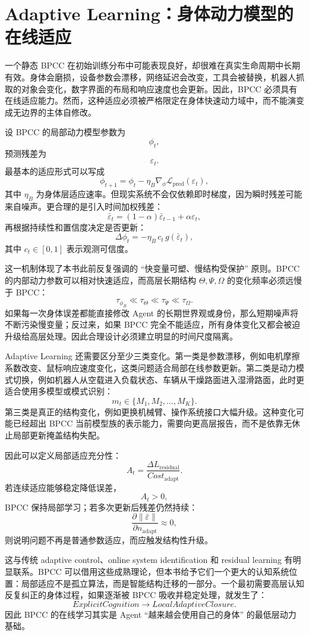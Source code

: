 \section{Adaptive Learning：身体动力模型的在线适应}

一个静态 BPCC 在初始训练分布中可能表现良好，却很难在真实生命周期中长期有效。身体会磨损，设备参数会漂移，网络延迟会改变，工具会被替换，机器人抓取的对象会变化，数字界面的布局和响应速度也会更新。因此，BPCC 必须具有在线适应能力。然而，这种适应必须被严格限定在身体快速动力域中，而不能演变成无边界的主体自修改。

设 BPCC 的局部动力模型参数为
\[
\phi_t,
\]
预测残差为
\[
\varepsilon_t.
\]
最基本的适应形式可以写成
\[
\phi_{t+1}
=
\phi_t
-
\eta_B
\nabla_\phi
\mathcal L_{\mathrm{pred}}
(\varepsilon_t),
\]
其中 $\eta_B$ 为身体层适应速率。但现实系统不会仅依赖即时梯度，因为瞬时残差可能来自噪声。更合理的是引入时间加权残差：
\[
\bar\varepsilon_t
=
(1-\alpha)\bar\varepsilon_{t-1}
+
\alpha\varepsilon_t,
\]
再根据持续性和置信度决定是否更新：
\[
\Delta\phi_t
=
-\eta_B
\,c_t
\,g(\bar\varepsilon_t),
\]
其中 $c_t\in[0,1]$ 表示观测可信度。

这一机制体现了本书此前反复强调的 ``快变量可塑、慢结构受保护'' 原则。BPCC 的内部动力参数可以相对快速适应，而高层长期结构 $\Theta,\Psi,\Omega$ 的变化频率必须远慢于 BPCC：
\[
\tau_{\phi_B}
\ll
\tau_\Theta
\ll
\tau_\Psi
\ll
\tau_\Omega.
\]
如果每一次身体误差都能直接修改 Agent 的长期世界观或身份，那么短期噪声将不断污染慢变量；反过来，如果 BPCC 完全不能适应，所有身体变化又都会被迫升级给高层处理。因此合理设计必须建立明显的时间尺度隔离。

Adaptive Learning 还需要区分至少三类变化。第一类是参数漂移，例如电机摩擦系数改变、鼠标响应速度变化，这类问题适合局部在线参数更新。第二类是动力模式切换，例如机器人从空载进入负载状态、车辆从干燥路面进入湿滑路面，此时更适合使用多模型或模式识别：
\[
m_t
\in
\{M_1,M_2,\ldots,M_K\}.
\]
第三类是真正的结构变化，例如更换机械臂、操作系统接口大幅升级。这种变化可能已经超出 BPCC 当前模型族的表示能力，需要向更高层报告，而不是依靠无休止局部更新掩盖结构失配。

因此可以定义局部适应充分性：
\[
A_t
=
\frac{
\Delta L_{\mathrm{residual}}
}{
Cost_{\mathrm{adapt}}
}.
\]
若连续适应能够稳定降低误差，
\[
A_t>0,
\]
BPCC 保持局部学习；若多次更新后残差仍然持续：
\[
\frac{\partial
\|\bar\varepsilon\|
}{
\partial n_{\mathrm{adapt}}
}
\approx0,
\]
则说明问题不再是普通参数适应，而应触发结构性升级。

这与传统 adaptive control、online system identification 和 residual learning 有明显联系。BPCC 可以借用这些成熟理论，但本书给予它们一个更大的认知系统位置：局部适应不是孤立算法，而是智能结构迁移的一部分。一个最初需要高层认知反复纠正的身体过程，如果逐渐被 BPCC 吸收并稳定处理，就发生了：
\[
ExplicitCognition
\rightarrow
LocalAdaptiveClosure.
\]
因此 BPCC 的在线学习其实是 Agent ``越来越会使用自己的身体'' 的最低层动力基础。

